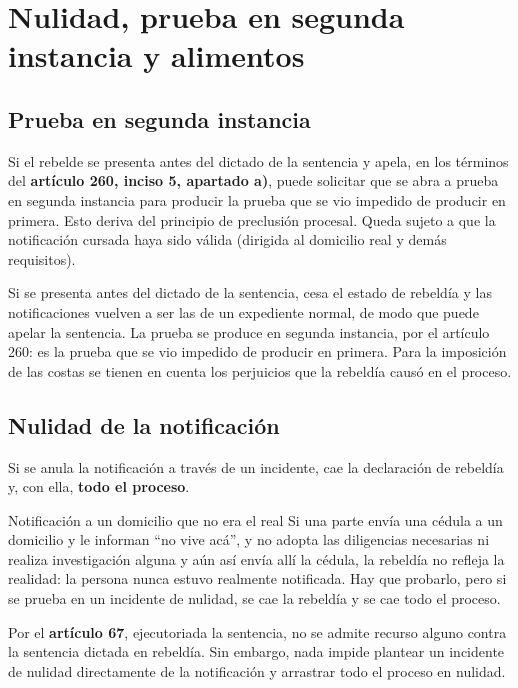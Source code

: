 \documentclass[12pt,oneside]{book}
\begin{document}
\section{Nulidad, prueba en segunda instancia y alimentos}

\subsection{Prueba en segunda instancia}

Si el rebelde se presenta antes del dictado de la sentencia y apela, en los t\'erminos del \textbf{art\'iculo 260, inciso 5, apartado a)}, puede solicitar que se abra a prueba en segunda instancia para producir la prueba que se vio impedido de producir en primera. Esto deriva del principio de preclusi\'on procesal. Queda sujeto a que la notificaci\'on cursada haya sido v\'alida (dirigida al domicilio real y dem\'as requisitos).

Si se presenta antes del dictado de la sentencia, cesa el estado de rebeld\'ia y las notificaciones vuelven a ser las de un expediente normal, de modo que puede apelar la sentencia. La prueba se produce en segunda instancia, por el art\'iculo 260: es la prueba que se vio impedido de producir en primera. Para la imposici\'on de las costas se tienen en cuenta los perjuicios que la rebeld\'ia caus\'o en el proceso.

\subsection{Nulidad de la notificaci\'on}

Si se anula la notificaci\'on a trav\'es de un incidente, cae la declaraci\'on de rebeld\'ia y, con ella, \textbf{todo el proceso}.

\begin{example}{Notificaci\'on a un domicilio que no era el real}
Si una parte env\'ia una c\'edula a un domicilio y le informan ``no vive ac\'a'', y no adopta las diligencias necesarias ni realiza investigaci\'on alguna y a\'un as\'i env\'ia all\'i la c\'edula, la rebeld\'ia no refleja la realidad: la persona nunca estuvo realmente notificada. Hay que probarlo, pero si se prueba en un incidente de nulidad, se cae la rebeld\'ia y se cae todo el proceso.
\end{example}

Por el \textbf{art\'iculo 67}, ejecutoriada la sentencia, no se admite recurso alguno contra la sentencia dictada en rebeld\'ia. Sin embargo, nada impide plantear un incidente de nulidad directamente de la notificaci\'on y arrastrar todo el proceso en nulidad.
\end{document}
